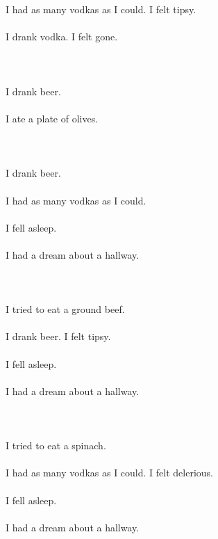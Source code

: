 \documentclass{article}
\begin{document}
    \section{}
    I had as many vodkas as I could. I felt tipsy.\\\\I drank vodka. I felt gone.\\\\ 
    \newpage
    
    \section{}
    I drank beer.\\\\I ate a plate of olives.\\\\ 
    \newpage
    
    \section{}
    I drank beer.\\\\I had as many vodkas as I could.\\\\I fell asleep.\\\\I had a dream about a hallway.\\\\ 
    \newpage
    
    \section{}
    I tried to eat a ground beef.\\\\I drank beer. I felt tipsy.\\\\I fell asleep.\\\\I had a dream about a hallway.\\\\ 
    \newpage
    
    \section{}
    I tried to eat a spinach.\\\\I had as many vodkas as I could. I felt delerious.\\\\I fell asleep.\\\\I had a dream about a hallway.\\\\ 
    \newpage
    
\end{document}
